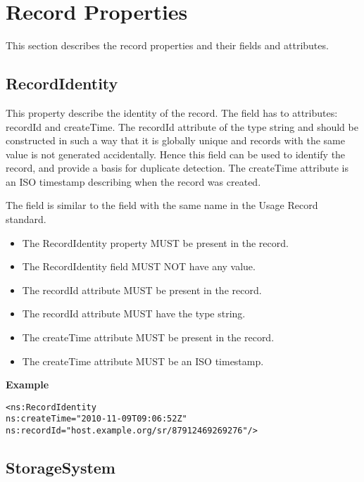 
\section{Record Properties}

This section describes the record properties and their fields and attributes.



\subsection{RecordIdentity}

This property describe the identity of the record. The field has to attributes:
recordId and createTime. The recordId attribute of the type string and should
be constructed in such a way that it is globally unique and records with the
same value is not generated accidentally. Hence this field can be used to identify
the record, and provide a basis for duplicate detection. The createTime
attribute is an ISO timestamp describing when the record was created.

The field is similar to the field with the same name in the Usage Record
standard.

\begin{itemize}
\item The RecordIdentity property MUST be present in the record.
\item The RecordIdentity field MUST NOT have any value.
\item The recordId attribute MUST be present in the record.
\item The recordId attribute MUST have the type string.
\item The createTime attribute MUST be present in the record.
\item The createTime attribute MUST be an ISO timestamp.
\end{itemize}

{\bf Example}
\begin{verbatim}
<ns:RecordIdentity
ns:createTime="2010-11-09T09:06:52Z"
ns:recordId="host.example.org/sr/87912469269276"/>
\end{verbatim}


\subsection{StorageSystem}

